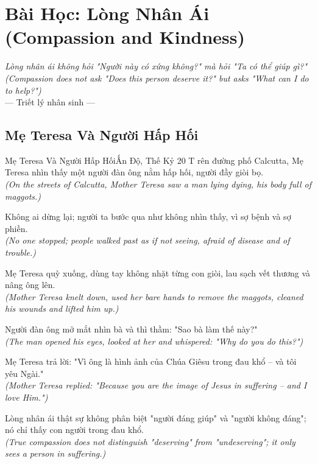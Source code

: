 \chapter{Bài Học: Lòng Nhân Ái (Compassion and Kindness)}
\begin{center}
  \textit{\color{truyenblue}Lòng nhân ái không hỏi "Người này có xứng không?" mà hỏi "Ta có thể giúp gì?"}\\
  \textit{(Compassion does not ask "Does this person deserve it?" but asks "What can I do to help?")}\\[4pt]
  \small\color{truyengold}--- Triết lý nhân sinh ---
\end{center}
\ngancach

\section{Mẹ Teresa Và Người Hấp Hối}
\begin{truyen}{Mẹ Teresa Và Người Hấp Hối}{Ấn Độ, Thế Kỷ 20}
T rên đường phố Calcutta, Mẹ Teresa nhìn thấy một người đàn ông nằm hấp hối, người đầy giòi bọ.\\
\textit{(On the streets of Calcutta, Mother Teresa saw a man lying dying, his body full of maggots.)}

Không ai dừng lại; người ta bước qua như không nhìn thấy, vì sợ bệnh và sợ phiền.\\
\textit{(No one stopped; people walked past as if not seeing, afraid of disease and of trouble.)}

Mẹ Teresa quỳ xuống, dùng tay không nhặt từng con giòi, lau sạch vết thương và nâng ông lên.\\
\textit{(Mother Teresa knelt down, used her bare hands to remove the maggots, cleaned his wounds and lifted him up.)}

Người đàn ông mở mắt nhìn bà và thì thầm: "Sao bà làm thế này?"\\
\textit{(The man opened his eyes, looked at her and whispered: "Why do you do this?")}

Mẹ Teresa trả lời: "Vì ông là hình ảnh của Chúa Giêsu trong đau khổ -- và tôi yêu Ngài."\\
\textit{(Mother Teresa replied: "Because you are the image of Jesus in suffering -- and I love Him.")}

\end{truyen}
\begin{baihoc}
  Lòng nhân ái thật sự không phân biệt "người đáng giúp" và "người không đáng"; nó chỉ thấy con người trong đau khổ.\\
  \textit{(True compassion does not distinguish "deserving" from "undeserving"; it only sees a person in suffering.)}
\end{baihoc}

